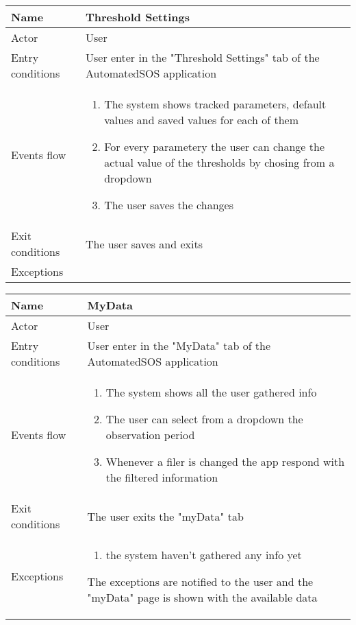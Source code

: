 \begin{table}[h!]
\begin{tabular}{|l|p{12cm}|}
\hline
Name             & Threshold Settings \\ \hline
Actor            & User \\ \hline
Entry conditions & User enter in the "Threshold Settings" tab of the AutomatedSOS application \\ \hline
Events flow      & \begin{enumerate}
\item The system shows tracked parameters, default values and saved values for each of them
\item For every parametery the user can change the actual value of the thresholds by chosing from a dropdown
\item The user saves the changes
\end{enumerate} \\ \hline
Exit conditions  & The user saves and exits \\ \hline
Exceptions       &  \\ \hline
\end{tabular}
\end{table}

\newpage
\begin{table}[h!]
\begin{tabular}{|l|p{12cm}|}
\hline
Name             & MyData \\ \hline
Actor            & User \\ \hline
Entry conditions & User enter in the "MyData" tab of the AutomatedSOS application \\ \hline
Events flow      & \begin{enumerate}
\item The system shows all the user gathered info
\item The user can select from a dropdown the observation period
\item Whenever a filer is changed the app respond with the filtered information
\end{enumerate} \\ \hline
Exit conditions  & The user exits the "myData" tab \\ \hline
Exceptions       & \begin{enumerate}
\item the system haven't gathered any info yet
\end{enumerate} The exceptions are notified to the user and the "myData" page is shown with the available data \\ \hline
\end{tabular}
\end{table}

